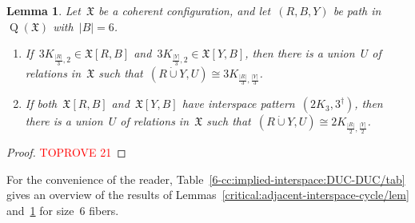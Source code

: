 \documentclass[english,a4paper]{article}
\theoremstyle{plain}
\newtheorem{lemma}      [theorem]{Lemma}
\theoremstyle{definition}
\newcommand{\abs}[1]{| #1 |}
\newcommand{\disjointUnion}{\ensuremath{\mathbin{\dot{\cup}}}}
\newcommand{\coherentConfig}{\ensuremath{\mathfrak{X}}}
\newcommand{\interspace}[2]{\ensuremath{\coherentConfig[#1,#2]}}
\DeclareMathOperator*{\Quotient}{Q}
\newcommand{\quotientGraph}[1]{\ensuremath{\Quotient(#1)}}
\newcommand{\ipsixTriangle}               {\ensuremath{(\disjointCliques{2}{3},3^\dag)}}
\newcommand{\clique}[1]{\ensuremath{K_{#1}}}
\newcommand{\disjointCliques}[2]{\ensuremath{#1 \clique{#2}}}
\begin{document}
\begin{lemma}
\label{6-cc:implied-interspace:DUC-DUC/lem}
    Let~$\coherentConfig$ be a coherent configuration, and let~$(R,B,Y)$ be path in~$\quotientGraph{\coherentConfig}$ with~$\abs{B} = 6$.
    \begin{enumerate}
        \item
        If~$\disjointCliques{3}{\frac{\abs{R}}{3},2} \in \interspace{R}{B}$ and~$\disjointCliques{3}{\frac{\abs{Y}}{3},2} \in \interspace{Y}{B}$,
        then there is a union~$U$ of relations in~$\coherentConfig$ such that~$(R \disjointUnion Y, U) \cong \disjointCliques{3}{\frac{\abs{R}}{3},\frac{\abs{Y}}{3}}$.

        \item
        If both~$\interspace{R}{B}$ and~$\interspace{Y}{B}$ have interspace pattern~$\ipsixTriangle$,
        then there is a union~$U$ of relations in~$\coherentConfig$ such that~$(R \disjointUnion Y, U) \cong \disjointCliques{2}{\frac{\abs{R}}{2},\frac{\abs{Y}}{2}}$.
    \end{enumerate}
\end{lemma}
\begin{proof}\textcolor{red}{TOPROVE 21}\end{proof}


For the convenience of the reader, Table~\ref{6-cc:implied-interspace:DUC-DUC/tab} gives an overview of the results of Lemmas~\ref{critical:adjacent-interspace-cycle/lem} and~\ref{6-cc:implied-interspace:DUC-DUC/lem} for size~$6$ fibers.
\end{document}
